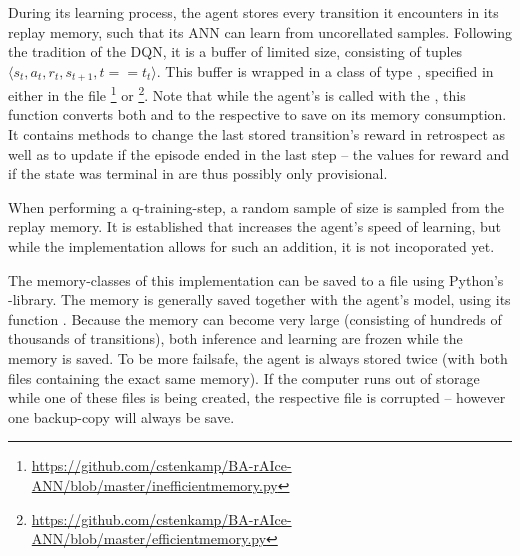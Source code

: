 
During its learning process, the agent stores every transition it encounters in its replay memory, such that its ANN can learn from uncorellated samples. Following the tradition of the DQN\cite{mnih_human-level_2015}, it is a buffer of limited size, consisting of tuples $\langle s_t, a_t, r_t, s_{t+1}, t==t_t \rangle$. This buffer is wrapped in a class of type , specified in either in the file \footnote{\url{https://github.com/cstenkamp/BA-rAIce-ANN/blob/master/inefficientmemory.py}} or \footnote{\url{https://github.com/cstenkamp/BA-rAIce-ANN/blob/master/efficientmemory.py}}. Note that while the agent's  is called with the , this function converts both  and  to the respective  to save on its memory consumption. It contains methods to change the last stored transition's reward in retrospect as well as to update if the episode ended in the last step -- the values for reward and if the state was terminal in  are thus possibly only provisional.

When performing a q-training-step, a random sample of size  is sampled from the replay memory. It is established that \cite{schaul_prioritized_2015} increases the agent's speed of learning, but while the implementation allows for such an addition, it is not incoporated yet.

The memory-classes of this implementation can be saved to a file using Python's -library. The memory is generally saved together with the agent's model, using its function . Because the memory can become very large (consisting of hundreds of thousands of transitions), both inference and learning are frozen while the memory is saved. To be more failsafe, the agent is always stored twice (with both files containing the exact same memory). If the computer runs out of storage while one of these files is being created, the respective file is corrupted -- however one backup-copy will always be save.

